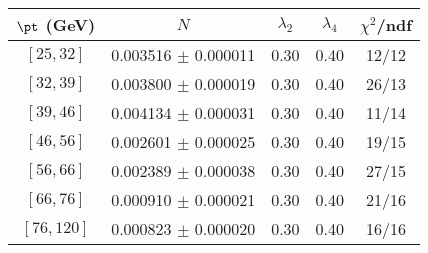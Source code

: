 \begin{tabular}{c||c|c|c|c}
$\pt$ (GeV) & $N$ & $\lambda_{2}$ & $\lambda_4$  & $\chi^2$/ndf  \\
\hline
$[25, 32]$ & 0.003516 $\pm$ 0.000011 & 0.30 & 0.40 & 12/12\\
$[32, 39]$ & 0.003800 $\pm$ 0.000019 & 0.30 & 0.40 & 26/13\\
$[39, 46]$ & 0.004134 $\pm$ 0.000031 & 0.30 & 0.40 & 11/14\\
$[46, 56]$ & 0.002601 $\pm$ 0.000025 & 0.30 & 0.40 & 19/15\\
$[56, 66]$ & 0.002389 $\pm$ 0.000038 & 0.30 & 0.40 & 27/15\\
$[66, 76]$ & 0.000910 $\pm$ 0.000021 & 0.30 & 0.40 & 21/16\\
$[76, 120]$ & 0.000823 $\pm$ 0.000020 & 0.30 & 0.40 & 16/16\\
\end{tabular}
